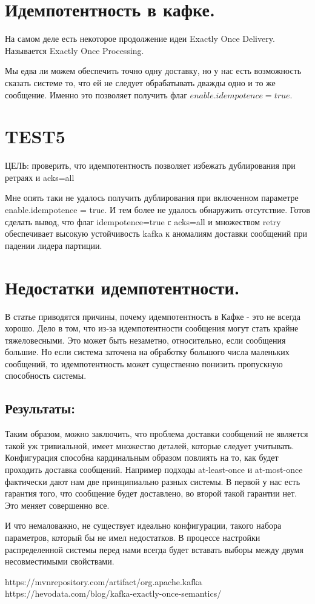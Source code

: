 \documentclass[11pt]{article}
\begin{document}
    \section{Идемпотентность в кафке.}
    На самом деле есть некоторое продолжение идеи Exactly Once Delivery. Называется Exactly Once Processing.

    Мы едва ли можем обеспечить точно одну доставку, но у нас есть возможность сказать системе то, что ей не следует обрабатывать дважды одно и то же сообщение. Именно это позволяет получить флаг $enable.idempotence = true$.
    
    \section{TEST5}
    ЦЕЛЬ: проверить, что идемпотентность позволяет избежать дублирования при ретраях и acks=all

    Мне опять таки не удалось получить дублирования при включенном параметре enable.idempotence = true. И тем более не удалось обнаружить отсутствие. Готов сделать вывод, что флаг idempotence=true с acks=all и множеством retry обеспечивает высокую устойчивость kafka к аномалиям доставки сообщений при падении лидера партиции.
    \section{Недостатки идемпотентности.}
    В статье приводятся причины, почему идемпотентность в Кафке - это не всегда хорошо. Дело в том, что
    из-за идемпотентности сообщения могут стать крайне тяжеловесными. Это может быть незаметно, относительно, если
    сообщения большие. Но если система заточена на обработку большого числа маленьких сообщений, то идемпотентность
    может существенно понизить пропускную способность системы.
    \subsection{Результаты:}
    Таким образом, можно заключить, что проблема доставки сообщений не является такой уж тривиальной, имеет множество
    деталей, которые следует учитывать. Конфигурация способна кардинальным образом повлиять на то, как будет
    проходить доставка сообщений. Например подходы at-least-once и at-most-once фактически дают нам две принципиально
    разных системы. В первой у нас есть гарантия того, что сообщение будет доставлено, во второй такой гарантии нет.
    Это меняет совершенно все.

    И что немаловажно, не существует идеально конфигурации, такого набора параметров, который бы не имел недостатков.
    В процессе настройки распределенной системы перед нами всегда будет вставать выборы между двумя несовместимыми
    свойствами.
    \begin{thebibliography}{name}
         https://mvnrepository.com/artifact/org.apache.kafka
         https://hevodata.com/blog/kafka-exactly-once-semantics/
    \end{thebibliography}
\end{document}
